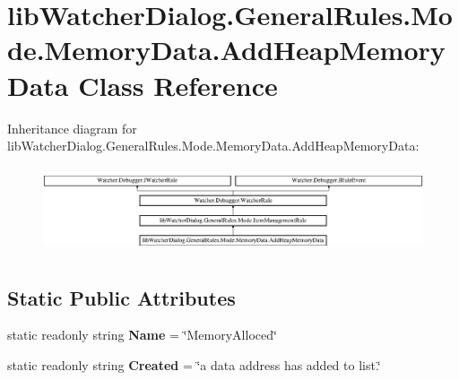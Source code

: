 \hypertarget{classlib_watcher_dialog_1_1_general_rules_1_1_mode_1_1_memory_data_1_1_add_heap_memory_data}{\section{lib\+Watcher\+Dialog.\+General\+Rules.\+Mode.\+Memory\+Data.\+Add\+Heap\+Memory\+Data Class Reference}
\label{classlib_watcher_dialog_1_1_general_rules_1_1_mode_1_1_memory_data_1_1_add_heap_memory_data}
}
Inheritance diagram for lib\+Watcher\+Dialog.\+General\+Rules.\+Mode.\+Memory\+Data.\+Add\+Heap\+Memory\+Data\+:\begin{figure}[H]
\begin{center}
\leavevmode
\includegraphics[height=2.562929cm]{classlib_watcher_dialog_1_1_general_rules_1_1_mode_1_1_memory_data_1_1_add_heap_memory_data}
\end{center}
\end{figure}
\subsection*{Static Public Attributes}
\begin{DoxyCompactItemize}
\item 
\hypertarget{classlib_watcher_dialog_1_1_general_rules_1_1_mode_1_1_memory_data_1_1_add_heap_memory_data_a6ca660156f3654612e71b77c2754f7ec}{static readonly string {\bfseries Name} = \char`\"{}Memory\+Alloced\char`\"{}}\label{classlib_watcher_dialog_1_1_general_rules_1_1_mode_1_1_memory_data_1_1_add_heap_memory_data_a6ca660156f3654612e71b77c2754f7ec}

\item 
\hypertarget{classlib_watcher_dialog_1_1_general_rules_1_1_mode_1_1_memory_data_1_1_add_heap_memory_data_a2a74c0870f56a0a4812335507a1a185f}{static readonly string {\bfseries Created} = \char`\"{}a data address has added to list.\char`\"{}}\label{classlib_watcher_dialog_1_1_general_rules_1_1_mode_1_1_memory_data_1_1_add_heap_memory_data_a2a74c0870f56a0a4812335507a1a185f}

\end{DoxyCompactItemize}
